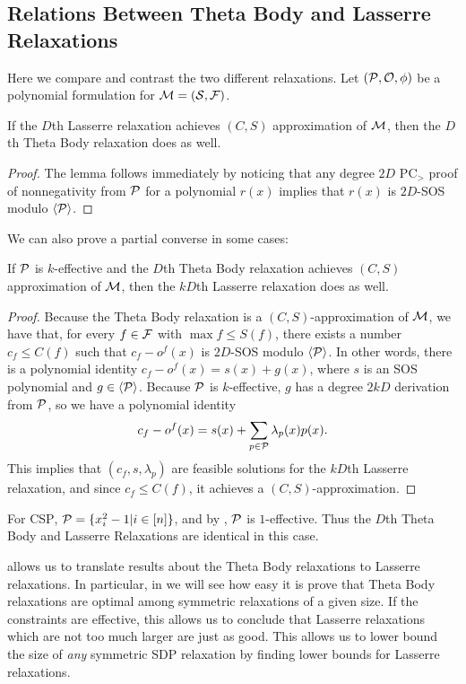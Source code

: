 \subsection{Relations Between Theta Body and Lasserre Relaxations}
Here we compare and contrast the two different relaxations. Let $(\mathcal P, \mathcal O, \phi)$ be a polynomial formulation for $\mathcal M = (\mathcal S, \mathcal F)$. 
\begin{lemma}
If the $D$th Lasserre relaxation achieves $(C,S)$ approximation of $\mathcal M$, then the $D$th Theta Body relaxation does as well. 
\end{lemma}
\begin{proof}
The lemma follows immediately by noticing that any degree $2D$ PC$_>$ proof of nonnegativity from $\mathcal P$ for a polynomial $r(x)$ implies that $r(x)$ is $2D$-SOS modulo $\langle \mathcal P \rangle$. 
\end{proof}
We can also prove a partial converse in some cases:
\begin{proposition}\label{prop:tb_to_sos}
If $\mathcal P$ is $k$-effective and the $D$th Theta Body relaxation achieves $(C,S)$ approximation of $\mathcal M$, then the $kD$th Lasserre relaxation does as well.
\end{proposition}
\begin{proof}
Because the Theta Body relaxation is a $(C,S)$-approximation of $\mathcal M$, we have that, for every $f \in \mathcal F$ with $\max f \leq S(f)$, there exists a number $c_f \leq C(f)$ such that $c_f - o^f(x)$ is $2D$-SOS modulo $\langle \mathcal P \rangle$. In other words, there is a polynomial identity $c_f - o^f(x) = s(x) + g(x)$, where $s$ is an SOS polynomial and $g \in \langle \mathcal P \rangle$. Because $\mathcal P$ is $k$-effective, $g$ has a degree $2kD$ derivation from $\mathcal P$, so we have a polynomial identity
\[c_f - o^f(x) = s(x) + \sum_{p \in \mathcal P} \lambda_p(x)p(x).\]
This implies that $(c_f, s, \lambda_p)$ are feasible solutions for the $kD$th Lasserre relaxation, and since $c_f \leq C(f)$, it achieves a $(C,S)$-approximation.
\end{proof}
\begin{example}
For \textsc{CSP}, $\mathcal P = \{x_i^2 - 1 | i \in [n]\}$, and by , $\mathcal P$ is $1$-effective. Thus the $D$th Theta Body and Lasserre Relaxations are identical in this case.
\end{example}
 allows us to translate results about the Theta Body relaxations to Lasserre relaxations. In particular, in  we will see how easy it is prove that Theta Body relaxations are optimal among symmetric relaxations of a given size. If the constraints are effective, this allows us to conclude that Lasserre relaxations which are not too much larger are just as good. This allows us to lower bound the size of \emph{any} symmetric SDP relaxation by finding lower bounds for Lasserre relaxations. 

